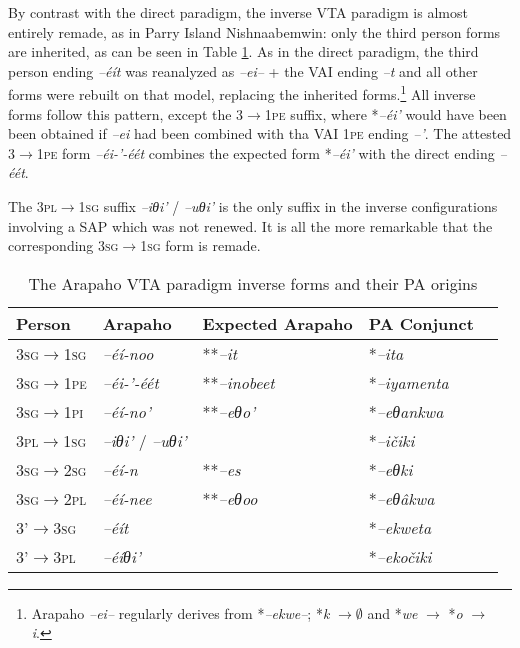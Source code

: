 \documentclass[twoside,a4paper,11pt]{article}
\newcommand{\ipa}[1]{{\phon\textit{#1}}}
\newcommand{\sg}{\textsc{sg}}
\newcommand{\pl}{\textsc{pl}}
\newcommand{\grise}[1]{\cellcolor{lightgray}\textbf{#1}}
\newcommand{\Σ}{\greek{Σ}}
\newcommand{\pli}{\textsc{pi}}
\newcommand{\pe}{\textsc{pe}}
\begin{document}
By contrast with the direct paradigm, the inverse VTA paradigm is almost entirely remade, as in Parry Island Nishnaabemwin: only the third person forms are inherited, as can be seen in Table \ref{tab:arapaho.vta.2}. As in the direct paradigm, the third person ending \ipa{--éít} was reanalyzed as \ipa{--ei--} + the VAI ending \ipa{--t} and all other forms were rebuilt on that model, replacing the inherited forms.\footnote{Arapaho \ipa{--ei--} regularly derives from *\ipa{--ekwe--}; *\ipa{k} $\rightarrow \emptyset $ and *\ipa{we} $\rightarrow $ *\ipa{o} $\rightarrow $ \ipa{i}. } All inverse forms follow this pattern, except the 3$\rightarrow$1\pe{} suffix, where *\ipa{--éi'} would have been been obtained if \ipa{--ei} had been combined with tha VAI 1\pe{} ending \ipa{--'}. The attested 3$\rightarrow$1\pe{} form \ipa{--éi-'-éét} combines the expected form *\ipa{--éi'} with the direct ending \ipa{--éét}.

The 3\pl{}$\rightarrow$1\sg{} suffix	 \ipa{--iθi'} /	\ipa{--uθi'} is the only  suffix in the inverse configurations involving a SAP which was not renewed. It is all the more remarkable that the corresponding 3\sg{}$\rightarrow$1\sg{} form is remade.

\begin{table}[H]
\caption{The Arapaho VTA paradigm inverse forms and their PA origins}
\centering \label{tab:arapaho.vta.2}
\begin{tabular}{lllll}
\toprule
Person & Arapaho & Expected Arapaho&PA Conjunct    \\
\midrule
3\sg{}$\rightarrow$1\sg{} & 	\ipa{--éí-noo}\grise{} &   **\ipa{--it}&	*\ipa{--ita} & 		\\
3\sg{}$\rightarrow$1\pe{} & 	\ipa{--éi-'-éét} \grise{}&**\ipa{--inobeet}& *\ipa{--iyamenta} & 		\\
3\sg{}$\rightarrow$1\pli{} & 	\ipa{--éí-no'} \grise{}& 	**\ipa{--eθo'}&*\ipa{--eθankwa} & 		\\
\midrule
3\pl{}$\rightarrow$1\sg{} & 	 \ipa{--iθi'} /	\ipa{--uθi'} &    &	*\ipa{--ičiki} & 		\\
\midrule
3\sg{}$\rightarrow$2\sg{} & 	\ipa{--éí-n} \grise{}&**\ipa{--es}& *\ipa{--eθki} & 		\\
3\sg{}$\rightarrow$2\pl{} & 	\ipa{--éí-nee} \grise{}& **\ipa{--eθoo}&*\ipa{--eθâkwa} & 		\\
\midrule
3'$\rightarrow$3\sg{} & 	\ipa{--éít} & &	*\ipa{--ekweta} & 		\\
3'$\rightarrow$3\pl{} & 	\ipa{--éíθi'} & &	*\ipa{--ekočiki} & 		\\
\bottomrule
\end{tabular}
\end{table}
\end{document}
